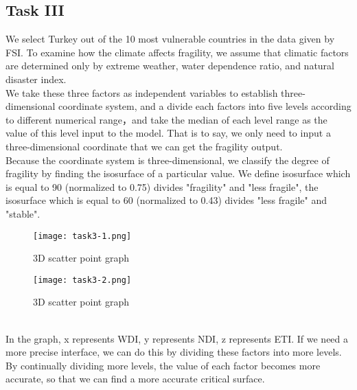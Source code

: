 \documentclass{mcmthesis}
\begin{document}
\subsection{Task III}
We select Turkey out of the 10 most vulnerable countries in the data given by FSI. To examine how the climate affects fragility, we assume that climatic factors are determined only by extreme weather, water dependence ratio, and natural disaster index.\\
We take these three factors as independent variables to establish three-dimensional coordinate system, and a divide each factors into five levels according to different numerical range，and take the median of each level range as the value of this level input to the model. That is to say, we only need to input a three-dimensional coordinate that we can get the fragility output.\\
Because the coordinate system is three-dimensional, we classify the degree of fragility by finding the isosurface of a particular value. We define isosurface which is equal to 90 (normalized to 0.75) divides  "fragility" and "less fragile", the isosurface which is equal to 60 (normalized to 0.43) divides "less fragile" and "stable".
\begin{figure}[h]
  \begin{minipage}[h]{0.48\textwidth}
  \flushleft
  \texttt{[image: task3-1.png]}
  \caption{3D scatter point graph}
  \end{minipage}
  \begin{minipage}[h]{0.48\textwidth}
  \flushright
  \texttt{[image: task3-2.png]}
  \caption{3D scatter point graph}
  \end{minipage}
\end{figure} \\
\newpage
In the graph, x represents WDI, y represents NDI, z represents ETI. 
If we need a more precise interface, we can do this by dividing these factors into more levels. By continually dividing more levels, the value of each factor becomes more accurate, so that we can find a more accurate critical surface.
\end{document}
